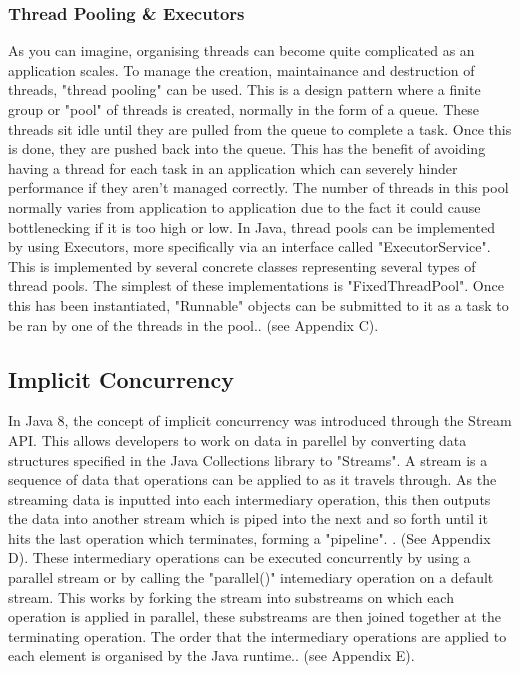 \documentclass[]{report}
\begin{document}
\subsubsection{Thread Pooling \& Executors}
As you can imagine, organising threads can become quite complicated as an application scales. To manage the creation, maintainance and destruction of threads, "thread pooling" can be used. This is a design pattern where a finite group or "pool" of threads is created, normally in the form of a queue. These threads sit idle until they are pulled from the queue to complete a task. Once this is done, they are pushed back into the queue. This has the benefit of avoiding having a thread for each task in an application which can severely hinder performance if they aren't managed correctly. The number of threads in this pool normally varies from application to application due to the fact it could cause bottlenecking if it is too high or low. In Java, thread pools can be implemented by using Executors, more specifically via an interface called "ExecutorService". This is implemented by several concrete classes representing several types of thread pools. The simplest of these implementations is "FixedThreadPool". Once this has been instantiated, "Runnable" objects can be submitted to it as a task to be ran by one of the threads in the pool.\cite{Thread Pools}. (see Appendix C).

\subsection{Implicit Concurrency}

In Java 8, the concept of implicit concurrency was introduced through the Stream API. This allows developers to work on data in parellel by converting data structures specified in the Java Collections library to "Streams". A stream is a sequence of data that operations can be applied to as it travels through. As the streaming data is inputted into each intermediary operation, this then outputs the data into another stream which is piped into the next and so forth until it hits the last operation which terminates, forming a "pipeline". \cite{Stream API}. (See Appendix D). These intermediary operations can be executed concurrently by using a parallel stream or by calling the "parallel()" intemediary operation on a default stream. This works by forking the stream into substreams on which each operation is applied in parallel, these substreams are then joined together at the terminating operation. The order that the intermediary operations are applied to each element is organised by the Java runtime.\cite{Stream API}. (see Appendix E).
\end{document}

